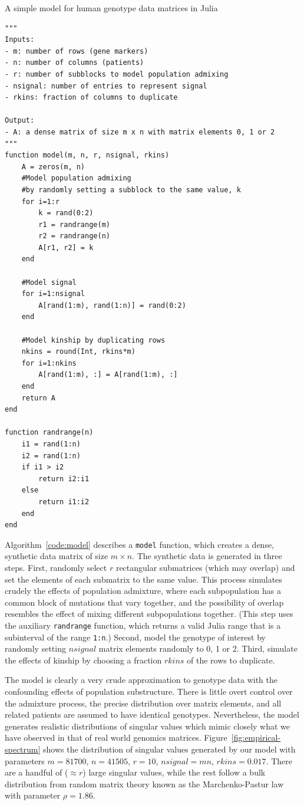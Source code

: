 \documentclass[review]{siamart0516}
\begin{document}
\begin{algorithm}
\caption{A simple model for human genotype data matrices in Julia
\label{code:model}}
\begin{lstlisting}
"""
Inputs:
- m: number of rows (gene markers)
- n: number of columns (patients)
- r: number of subblocks to model population admixing
- nsignal: number of entries to represent signal
- rkins: fraction of columns to duplicate

Output:
- A: a dense matrix of size m x n with matrix elements 0, 1 or 2
"""
function model(m, n, r, nsignal, rkins)
    A = zeros(m, n)
    #Model population admixing
    #by randomly setting a subblock to the same value, k
    for i=1:r
        k = rand(0:2)
        r1 = randrange(m)
        r2 = randrange(n)
        A[r1, r2] = k
    end

    #Model signal
    for i=1:nsignal
        A[rand(1:m), rand(1:n)] = rand(0:2)
    end

    #Model kinship by duplicating rows
    nkins = round(Int, rkins*m)
    for i=1:nkins
        A[rand(1:m), :] = A[rand(1:m), :]
    end
    return A
end

function randrange(n)
    i1 = rand(1:n)
    i2 = rand(1:n)
    if i1 > i2
        return i2:i1
    else
        return i1:i2
    end
end
\end{lstlisting}
\end{algorithm}

Algorithm~\ref{code:model} describes a \verb|model| function, which creates a
dense, synthetic data matrix of size $m\times n$. The synthetic data is
generated in three steps. First, randomly select $r$ rectangular submatrices
(which may overlap) and set the elements of each submatrix to the same value.
This process simulates crudely the effects of population admixture, where
each subpopulation has a common block of mutations that vary together, and the
possibility of overlap resembles the effect of mixing different subpopulations
together. (This step uses the auxiliary \verb|randrange| function, which returns
a valid Julia range that is a subinterval of the range \verb|1:n|.)
Second, model the genotype of interest by randomly setting $nsignal$ matrix
elements randomly to 0, 1 or 2.
Third, simulate the effects of kinship by choosing a fraction $rkins$ of the
rows to duplicate.

The model is clearly a very crude approximation to genotype data with the
confounding effects of population substructure. There is little overt control
over the admixture process, the precise distribution over matrix elements, and
all related patients are assumed to have identical genotypes. Nevertheless, the
model generates realistic distributions of singular values which mimic closely
what we have observed in that of real world genomics matrices.
Figure~\ref{fig:empirical-spectrum} shows the distribution of singular values
generated by our model with parameters $m=81700$, $n=41505$, $r=10$,
$nsignal=mn$, $rkins=0.017$.
There are a handful of ($\approx r$) large singular values,
while the rest follow a bulk distribution from random matrix theory known as the
Marchenko-Pastur law~\cite{Marchenko1967} with parameter $\rho = 1.86$.
\end{document}
